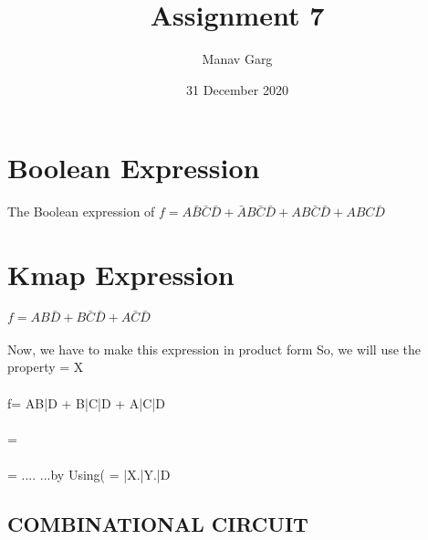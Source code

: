 \documentclass{article}
\begin{document}
\title{
Assignment 7
}
\author{Manav Garg}

\date{31 December 2020}
\maketitle


\section{Boolean Expression}
The Boolean expression of $f = A\bar{B}\bar{C}\bar{D} + \bar{A}B\bar{C}\bar{D} + AB\bar{C}\bar{D} + ABC\bar{D}$ \\ 
\section{Kmap Expression}
$f= AB\bar{D} + B\bar{C}\bar{D} + A\bar{C}\bar{D}$ \\
\\
Now, we have to make this expression in product form
So, we will use the property  = X\\
\\
f= AB\bar{D} + B\bar{C}\bar{D} + A\bar{C}\bar{D} \\
\\
 =  \\
\\
     = ....         ...by Using( = \bar{X}.\bar{Y}.\bar{D}




\subsection{COMBINATIONAL CIRCUIT}
\end{document}
